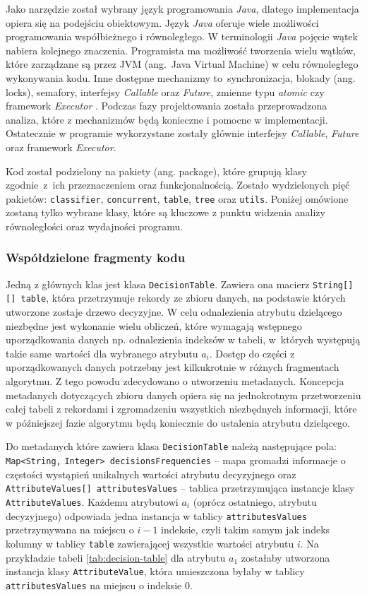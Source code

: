 \documentclass[12pt]{article}
\begin{document}
Jako narzędzie został wybrany język programowania \textit{Java}, dlatego implementacja opiera się na podejściu
obiektowym. Język \textit{Java} oferuje wiele możliwości programowania współbieżnego i równoległego. W terminologii \textit{Java}
pojęcie wątek nabiera kolejnego znaczenia. Programista ma możliwość tworzenia wielu wątków, które zarządzane są
przez JVM (ang.~Java Virtual Machine) w celu równoległego wykonywania kodu. Inne dostępne mechanizmy to~synchronizacja,
blokady (ang. locks), semafory, interfejsy \textit{Callable} oraz \textit{Future}, zmienne typu \textit{atomic} czy framework \textit{Executor} \cite{java-concurency-in-practice}.
Podczas fazy projektowania została przeprowadzona analiza, które z mechanizmów będą konieczne i pomocne
w implementacji. Ostatecznie w programie wykorzystane zostały głównie interfejsy \textit{Callable}, \textit{Future} oraz framework \textit{Executor}.

Kod został podzielony na pakiety (ang. package), które grupują klasy zgodnie~z~ich przeznaczeniem oraz funkcjonalnością. Zostało wydzielonych pięć pakietów:
\verb|classifier|, \verb|concurrent|, \verb|table|, \verb|tree| oraz \verb|utils|. Poniżej omówione zostaną tylko wybrane klasy, które są kluczowe z
punktu widzenia analizy równoległości oraz wydajności programu.

\subsubsection{Współdzielone fragmenty kodu}\label{common-code-blocks}

Jedną z głównych klas jest klasa \verb|DecisionTable|. Zawiera ona macierz \verb|String[][] table|, która przetrzymuje rekordy ze zbioru danych,
na podstawie których utworzone zostaje drzewo decyzyjne. W celu odnalezienia atrybutu dzielącego niezbędne jest wykonanie wielu obliczeń, które wymagają 
wstępnego uporządkowania danych np. odnalezienia indeksów w tabeli, w~których występują takie same wartości dla wybranego atrybutu $a_i$. 
Dostęp do części z uporządkowanych danych potrzebny jest kilkukrotnie w różnych fragmentach algorytmu. Z tego powodu zdecydowano o utworzeniu metadanych.
Koncepcja metadanych dotyczących zbioru danych opiera się na jednokrotnym przetworzeniu całej tabeli z rekordami i zgromadzeniu wszystkich niezbędnych
informacji, które w późniejszej fazie algorytmu będą koniecznie do ustalenia atrybutu dzielącego.

Do metadanych które zawiera klasa \verb|DecisionTable| należą następujące pola: \verb|Map<String,| \verb|Integer> decisionsFrequencies| -- mapa gromadzi informacje o częstości wystąpień
unikalnych wartości atrybutu decyzyjnego oraz \verb|AttributeValues[] attributesValues| -- tablica przetrzymująca instancje klasy \verb|AttributeValues|. Każdemu
atrybutowi $a_i$ (oprócz ostatniego, atrybutu decyzyjnego) odpowiada jedna instancja w tablicy \verb|attributesValues| przetrzymywana na miejscu o $i-1$ indeksie, czyli
takim samym jak indeks kolumny w tablicy \verb|table| zawierającej wszystkie wartości atrybutu $i$. Na przykładzie tabeli \ref{tab:decision-table} dla atrybutu $a_1$ zostałaby utworzona instancja klasy \verb|AttributeValue|, która umieszczona byłaby w tablicy
\verb|attributesValues| na miejscu o indeksie $0$.
\end{document}
